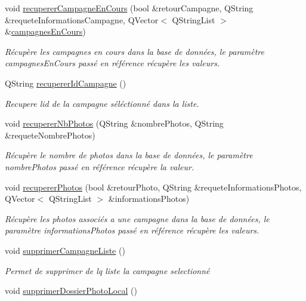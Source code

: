 \begin{DoxyCompactItemize}
void \hyperlink{class_i_h_m_accueil_a0ffb0f0c7c9c613083933514690f2772}{recuperer\+Campagne\+En\+Cours} (bool \&retour\+Campagne, Q\+String \&requete\+Informations\+Campagne, Q\+Vector$<$ Q\+String\+List $>$ \&\hyperlink{class_i_h_m_accueil_ad3827b81480eb201b5927c16a2ad1c46}{campagnes\+En\+Cours})
\begin{DoxyCompactList}\small\item\em Récupère les campagnes en cours dans la base de données, le paramètre campagnes\+En\+Cours passé en référence récupère les valeurs. \end{DoxyCompactList}\item 
Q\+String \hyperlink{class_i_h_m_accueil_a5e222617897b2c1f7e032fa851aa1700}{recuperer\+Id\+Campagne} ()
\begin{DoxyCompactList}\small\item\em Recupere l\textquotesingle{}id de la campagne séléctionné dans la liste. \end{DoxyCompactList}\item 
void \hyperlink{class_i_h_m_accueil_aa09878b2e3e3024220291165b5c528a6}{recuperer\+Nb\+Photos} (Q\+String \&nombre\+Photos, Q\+String \&requete\+Nombre\+Photos)
\begin{DoxyCompactList}\small\item\em Récupère le nombre de photos dans la base de données, le paramètre nombre\+Photos passé en référence récupère la valeur. \end{DoxyCompactList}\item 
void \hyperlink{class_i_h_m_accueil_aebeef48b9bc345edd02e5185951c454e}{recuperer\+Photos} (bool \&retour\+Photo, Q\+String \&requete\+Informations\+Photos, Q\+Vector$<$ Q\+String\+List $>$ \&informations\+Photos)
\begin{DoxyCompactList}\small\item\em Récupère les photos associés a une campagne dans la base de données, le paramètre informations\+Photos passé en référence récupère les valeurs. \end{DoxyCompactList}\item 
void \hyperlink{class_i_h_m_accueil_a36ce6ecca4e258562577bab1439e0a96}{supprimer\+Campagne\+Liste} ()
\begin{DoxyCompactList}\small\item\em Permet de supprimer de lq liste la campagne selectionné \end{DoxyCompactList}\item 
void \hyperlink{class_i_h_m_accueil_acb9679f51e140e0bc28d8ac10afd87e9}{supprimer\+Dossier\+Photo\+Local} ()

\end{DoxyCompactItemize}
